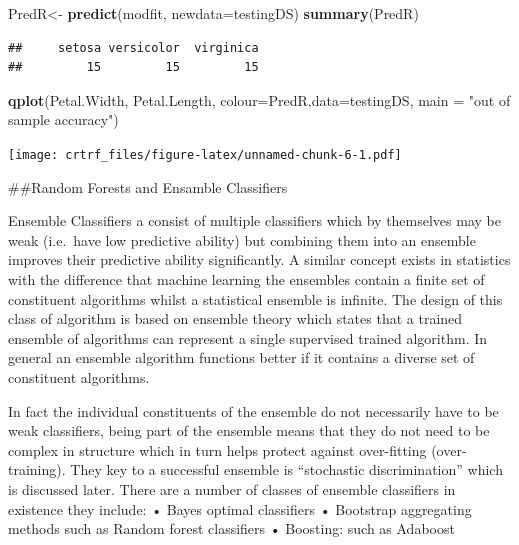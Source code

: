 \documentclass[
]{article}
\newenvironment{Shaded}{\begin{snugshade}}{\end{snugshade}}
\newcommand{\DataTypeTok}[1]{\textcolor[rgb]{0.13,0.29,0.53}{#1}}
\newcommand{\KeywordTok}[1]{\textcolor[rgb]{0.13,0.29,0.53}{\textbf{#1}}}
\newcommand{\NormalTok}[1]{#1}
\newcommand{\StringTok}[1]{\textcolor[rgb]{0.31,0.60,0.02}{#1}}
\begin{document}
\begin{Shaded}
\begin{Highlighting}[]
\NormalTok{PredR<-}\StringTok{ }\KeywordTok{predict}\NormalTok{(modfit, }\DataTypeTok{newdata=}\NormalTok{testingDS)}
\KeywordTok{summary}\NormalTok{(PredR)}
\end{Highlighting}
\end{Shaded}

\begin{verbatim}
##     setosa versicolor  virginica 
##         15         15         15
\end{verbatim}

\begin{Shaded}
\begin{Highlighting}[]
\KeywordTok{qplot}\NormalTok{(Petal.Width, Petal.Length, }\DataTypeTok{colour=}\NormalTok{PredR,}\DataTypeTok{data=}\NormalTok{testingDS, }\DataTypeTok{main =} \StringTok{"out of sample accuracy"}\NormalTok{)}
\end{Highlighting}
\end{Shaded}

\texttt{[image: crtrf\_files/figure-latex/unnamed-chunk-6-1.pdf]}

\#\#Random Forests and Ensamble Classifiers

Ensemble Classifiers a consist of multiple classifiers which by
themselves may be weak (i.e.~have low predictive ability) but combining
them into an ensemble improves their predictive ability significantly. A
similar concept exists in statistics with the difference that machine
learning the ensembles contain a finite set of constituent algorithms
whilst a statistical ensemble is infinite. The design of this class of
algorithm is based on ensemble theory which states that a trained
ensemble of algorithms can represent a single supervised trained
algorithm. In general an ensemble algorithm functions better if it
contains a diverse set of constituent algorithms.

In fact the individual constituents of the ensemble do not necessarily
have to be weak classifiers, being part of the ensemble means that they
do not need to be complex in structure which in turn helps protect
against over-fitting (over-training). They key to a successful ensemble
is ``stochastic discrimination'' which is discussed later. There are a
number of classes of ensemble classifiers in existence they include: •
Bayes optimal classifiers • Bootstrap aggregating methods such as Random
forest classifiers • Boosting: such as Adaboost
\end{document}
